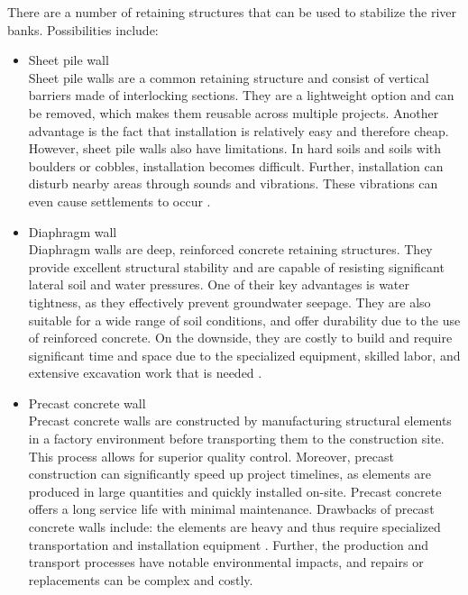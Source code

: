 There are a number of retaining structures that can be used to stabilize the river banks. Possibilities include:
\begin{itemize}
    \item Sheet pile wall\\
    Sheet pile walls are a common retaining structure and consist of vertical barriers made of interlocking sections. They are a lightweight option and can be removed, which makes them reusable across multiple projects. Another advantage is the fact that installation is relatively easy and therefore cheap. However, sheet pile walls also have limitations. In hard soils and soils with boulders or cobbles, installation becomes difficult. Further, installation can disturb nearby areas through sounds and vibrations. These vibrations can even cause settlements to occur \autocite{korffReaderDeepExcavations2023}.

    \item Diaphragm wall\\
    Diaphragm walls are deep, reinforced concrete retaining structures. They provide excellent structural stability and are capable of resisting significant lateral soil and water pressures. One of their key advantages is water tightness, as they effectively prevent groundwater seepage. They are also suitable for a wide range of soil conditions, and offer durability due to the use of reinforced concrete. On the downside, they are costly to build and require significant time and space due to the specialized equipment, skilled labor, and extensive excavation work that is needed \autocite{korffReaderDeepExcavations2023}.
    
    \item Precast concrete wall\\
    Precast concrete walls are constructed by manufacturing structural elements in a factory environment before transporting them to the construction site. This process allows for superior quality control. Moreover, precast construction can significantly speed up project timelines, as elements are produced in large quantities and quickly installed on-site. Precast concrete offers a long service life with minimal maintenance. Drawbacks of precast concrete walls include: the elements are heavy and thus require specialized transportation and installation equipment \autocite{mcneilengineeringAdvantagesDisadvantagesUsing2023}. Further, the production and transport processes have notable environmental impacts, and repairs or replacements can be complex and costly.


\end{itemize}
